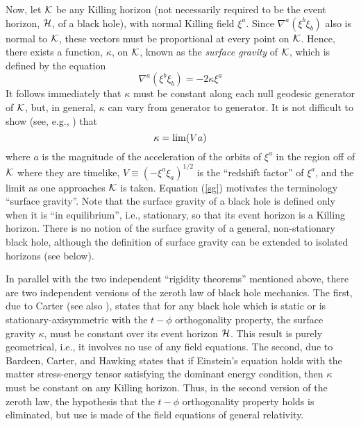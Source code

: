 Now, let ${\cal K}$ be any Killing horizon (not necessarily required
to be the event horizon, ${\cal H}$, of a black hole), with normal
Killing field $\xi^a$. Since $\nabla^a (\xi^b \xi_b)$ also is normal
to ${\cal K}$, these vectors must be proportional at every point on
${\cal K}$. Hence, there exists a function, $\kappa$, on ${\cal K}$,
known as the {\em surface gravity} of ${\cal K}$, which is defined by
the equation
\begin{equation}
\nabla^a (\xi^b \xi_b) = -2 \kappa \xi^a
\label{kappa}
\end{equation}
It follows immediately that $\kappa$ must be constant along each null
geodesic generator of ${\cal K}$, but, in general, $\kappa$ can vary
from generator to generator. It is not difficult to show (see, e.g.,
\cite{w3}) that
\begin{equation}
\kappa = {\rm lim} (Va)
\label{sg}
\end{equation}
where $a$ is the magnitude of the acceleration of the orbits of
$\xi^a$ in the region off of $\cal K$ where they are timelike, $V
\equiv (- \xi^a \xi_a)^{1/2}$ is the ``redshift factor'' of $\xi^a$,
and the limit as one approaches ${\cal K}$ is taken. Equation
(\ref{sg}) motivates the terminology ``surface gravity''. Note that
the surface gravity of a black hole is defined only when it is ``in
equilibrium'', i.e., stationary, so that its event horizon is a
Killing horizon. There is no notion of the surface gravity of a
general, non-stationary black hole, although the definition of surface
gravity can be extended to isolated horizons (see below).

In parallel with the two independent ``rigidity theorems'' mentioned
above, there are two independent versions of the zeroth law of black
hole mechanics. The first, due to Carter \cite{c} (see also
\cite{rw2}), states that for any black hole which is static or is
stationary-axisymmetric with the $t - \phi$ orthogonality property,
the surface gravity $\kappa$, must be constant over its event horizon
${\cal H}$. This result is purely geometrical, i.e., it involves no
use of any field equations. The second, due to Bardeen, Carter, and
Hawking \cite{bch} states that if Einstein's equation holds with the
matter stress-energy tensor satisfying the dominant energy condition,
then $\kappa$ must be constant on any Killing horizon. Thus, in the
second version of the zeroth law, the hypothesis that the $t - \phi$
orthogonality property holds is eliminated, but use is made of the
field equations of general relativity.

